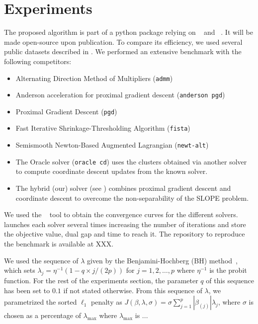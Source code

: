 \section{Experiments}\label{sec:experiments}

The proposed algorithm is part of a python package relying on ~\parencite{harris2020} and ~\parencite{lam2015}.
It will be made open-source upon publication. To compare its efficiency, we used several public datasets described in .
We performed an extensive benchmark with the following competitors:
\begin{itemize}[noitemsep]
  \item Alternating Direction Method of Multipliers (\texttt{admm})~\parencite{boyd2010}
  \item Anderson acceleration for proximal gradient descent (\texttt{anderson pgd})~\parencite{zhang2020}
  \item Proximal Gradient Descent (\texttt{pgd})~\parencite{combettes2005}
  \item Fast Iterative Shrinkage-Thresholding Algorithm (\texttt{fista})~\parencite{beck2009}
  \item Semismooth Newton-Based Augmented Lagrangian (\texttt{newt-alt})~\parencite{Ziyan2019}
  \item The Oracle solver (\texttt{oracle cd}) uses the clusters obtained via another
        solver to compute coordinate descent updates from the known solver.
  \item The hybrid (our) solver (see ) combines proximal gradient descent
        and coordinate descent to overcome the non-separability of the SLOPE problem.
\end{itemize}

We used the ~\parencite{moreau2022benchopt} tool to obtain the convergence curves for the different solvers.
 launches each solver several times increasing the number of iterations and store the objective value, dual gap and time to reach it.
The repository to reproduce the benchmark is available at XXX.

We used the sequence of $\lambda$ given by the Benjamini-Hochberg (BH) method~\parencite{bogdan2015},
which sets $\lambda_j = \eta^{-1}(1 - q\times j / (2p))$ for $j=1, 2, \hdots, p$ where $\eta^{-1}$ is the probit function. 
For the rest of the experiments section, the parameter $q$ of this sequence has been set to $0.1$ if not stated otherwise.
From this sequence of $\lambda$, we parametrized the sorted $\ell_1$ penalty as $J(\beta, \lambda, \sigma) = \sigma \sum_{j=1}^p |\beta_{(j)}| \lambda_j$, where $\sigma$ is chosen as a percentage of $\lambda_{\text{max}}$ where $\lambda_{\text{max}}$ is ...


